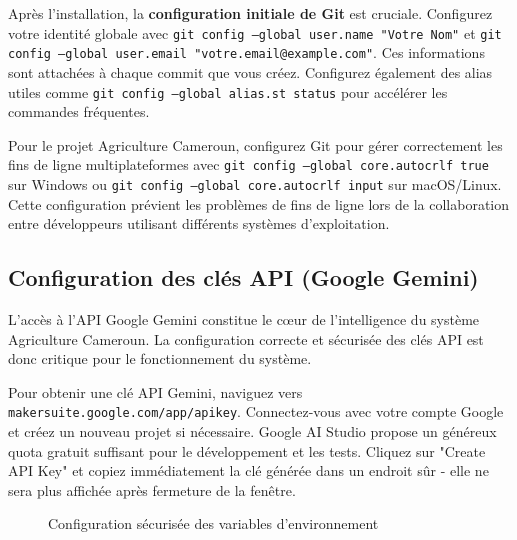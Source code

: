 Après l'installation, la \textbf{configuration initiale de Git} est cruciale. Configurez votre identité globale avec \texttt{git config --global user.name "Votre Nom"} et \texttt{git config --global user.email "votre.email@example.com"}. Ces informations sont attachées à chaque commit que vous créez. Configurez également des alias utiles comme \texttt{git config --global alias.st status} pour accélérer les commandes fréquentes.

Pour le projet Agriculture Cameroun, configurez Git pour gérer correctement les fins de ligne multiplateformes avec \texttt{git config --global core.autocrlf true} sur Windows ou \texttt{git config --global core.autocrlf input} sur macOS/Linux. Cette configuration prévient les problèmes de fins de ligne lors de la collaboration entre développeurs utilisant différents systèmes d'exploitation.

\subsection{Configuration des clés API (Google Gemini)}

L'accès à l'API Google Gemini constitue le cœur de l'intelligence du système Agriculture Cameroun. La configuration correcte et sécurisée des clés API est donc critique pour le fonctionnement du système.

Pour obtenir une clé API Gemini, naviguez vers \texttt{makersuite.google.com/app/apikey}. Connectez-vous avec votre compte Google et créez un nouveau projet si nécessaire. Google AI Studio propose un généreux quota gratuit suffisant pour le développement et les tests. Cliquez sur "Create API Key" et copiez immédiatement la clé générée dans un endroit sûr - elle ne sera plus affichée après fermeture de la fenêtre.

\begin{figure}[h]
\centering
{}
\caption{Configuration sécurisée des variables d'environnement}
\end{figure}

